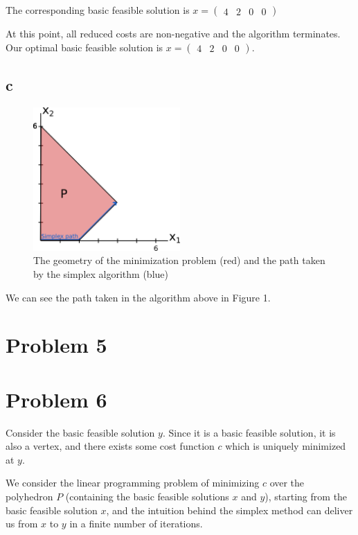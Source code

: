 \documentclass[11pt,a4paper]{article}
\begin{document}
The corresponding basic feasible solution is $x=\begin{pmatrix}4 & 2 & 0 & 0\end{pmatrix}$


At this point, all reduced costs are non-negative and the algorithm terminates. Our optimal basic feasible solution is $x=\begin{pmatrix}4 & 2 & 0 & 0\end{pmatrix}$.

\subsection*{c}

\begin{figure}[H]
\includegraphics[width=0.5\textwidth]{4c}
\centering
\caption{The geometry of the minimization problem (red) and the path taken by the simplex algorithm (blue)}
\end{figure}




We can see the path taken in the algorithm above in Figure 1.

\section*{Problem 5}

\section*{Problem 6}

Consider the basic feasible solution $y$. Since it is a basic feasible solution, it is also a vertex, and there exists some cost function $c$ which is uniquely minimized at $y$.

We consider the linear programming problem of minimizing $c$ over the polyhedron $P$ (containing the basic feasible solutions $x$ and $y$), starting from the basic feasible solution $x$, and the intuition behind the simplex method can deliver us from $x$ to $y$ in a finite number of iterations.
\end{document}

